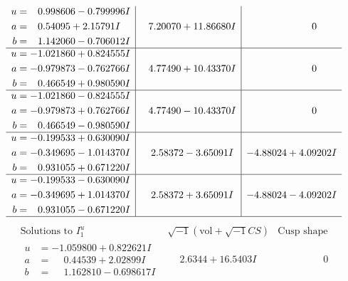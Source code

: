 \documentclass[1p]{elsarticle_modified}
\theoremstyle{definition}
\newcommand{\I}{\sqrt{-1}}
\begin{document}
$$\begin{array}{c|c|c}
\begin{aligned}
u &= \phantom{-}0.998606 - 0.799996 I \\
a &= \phantom{-}0.54095 + 2.15791 I \\
b &= \phantom{-}1.142060 - 0.706012 I\end{aligned}
 & \phantom{-}7.20070 + 11.86680 I & \phantom{-0.000000 } 0 \\ \hline\begin{aligned}
u &= -1.021860 + 0.824555 I \\
a &= -0.979873 - 0.762766 I \\
b &= \phantom{-}0.466549 + 0.980590 I\end{aligned}
 & \phantom{-}4.77490 + 10.43370 I & \phantom{-0.000000 } 0 \\ \hline\begin{aligned}
u &= -1.021860 - 0.824555 I \\
a &= -0.979873 + 0.762766 I \\
b &= \phantom{-}0.466549 - 0.980590 I\end{aligned}
 & \phantom{-}4.77490 - 10.43370 I & \phantom{-0.000000 } 0 \\ \hline\begin{aligned}
u &= -0.199533 + 0.630090 I \\
a &= -0.349695 - 1.014370 I \\
b &= \phantom{-}0.931055 + 0.671220 I\end{aligned}
 & \phantom{-}2.58372 - 3.65091 I & -4.88024 + 4.09202 I \\ \hline\begin{aligned}
u &= -0.199533 - 0.630090 I \\
a &= -0.349695 + 1.014370 I \\
b &= \phantom{-}0.931055 - 0.671220 I\end{aligned}
 & \phantom{-}2.58372 + 3.65091 I & -4.88024 - 4.09202 I\\
 \hline 
 \end{array}$$\newpage$$\begin{array}{c|c|c}  
\text{Solutions to }I^u_{1}& \I (\text{vol} + \sqrt{-1}CS) & \text{Cusp shape}\\
 \hline 
\begin{aligned}
u &= -1.059800 + 0.822621 I \\
a &= \phantom{-}0.44539 + 2.02899 I \\
b &= \phantom{-}1.162810 - 0.698617 I\end{aligned}
 & \phantom{-}2.6344 + 16.5403 I & \phantom{-0.000000 } 0 \\ \hline\begin{aligned}

\end{aligned}
\end{array}$$
\end{document}
